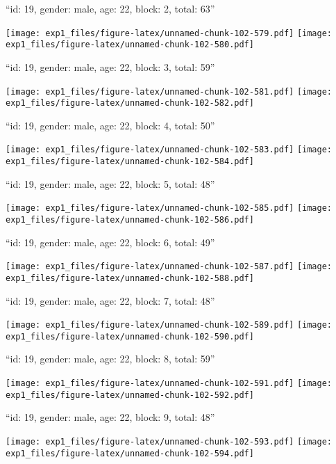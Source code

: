 \documentclass[11pt,,]{article}
\begin{document}
\newpage
[1] 

``id: 19, gender: male, age: 22, block: 2, total: 63''

\texttt{[image: exp1\_files/figure-latex/unnamed-chunk-102-579.pdf]}
\texttt{[image: exp1\_files/figure-latex/unnamed-chunk-102-580.pdf]}

\newpage
[1] 

``id: 19, gender: male, age: 22, block: 3, total: 59''

\texttt{[image: exp1\_files/figure-latex/unnamed-chunk-102-581.pdf]}
\texttt{[image: exp1\_files/figure-latex/unnamed-chunk-102-582.pdf]}

\newpage
[1] 

``id: 19, gender: male, age: 22, block: 4, total: 50''

\texttt{[image: exp1\_files/figure-latex/unnamed-chunk-102-583.pdf]}
\texttt{[image: exp1\_files/figure-latex/unnamed-chunk-102-584.pdf]}

\newpage
[1] 

``id: 19, gender: male, age: 22, block: 5, total: 48''

\texttt{[image: exp1\_files/figure-latex/unnamed-chunk-102-585.pdf]}
\texttt{[image: exp1\_files/figure-latex/unnamed-chunk-102-586.pdf]}

\newpage
[1] 

``id: 19, gender: male, age: 22, block: 6, total: 49''

\texttt{[image: exp1\_files/figure-latex/unnamed-chunk-102-587.pdf]}
\texttt{[image: exp1\_files/figure-latex/unnamed-chunk-102-588.pdf]}

\newpage
[1] 

``id: 19, gender: male, age: 22, block: 7, total: 48''

\texttt{[image: exp1\_files/figure-latex/unnamed-chunk-102-589.pdf]}
\texttt{[image: exp1\_files/figure-latex/unnamed-chunk-102-590.pdf]}

\newpage
[1] 

``id: 19, gender: male, age: 22, block: 8, total: 59''

\texttt{[image: exp1\_files/figure-latex/unnamed-chunk-102-591.pdf]}
\texttt{[image: exp1\_files/figure-latex/unnamed-chunk-102-592.pdf]}

\newpage
[1] 

``id: 19, gender: male, age: 22, block: 9, total: 48''

\texttt{[image: exp1\_files/figure-latex/unnamed-chunk-102-593.pdf]}
\texttt{[image: exp1\_files/figure-latex/unnamed-chunk-102-594.pdf]}
\end{document}
